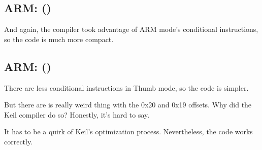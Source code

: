 ﻿\subsection{ARM: \OptimizingKeilVI (\ARMMode)}

And again, the compiler took advantage of ARM mode's conditional instructions, 
so the code is much more compact.



\subsection{ARM: \OptimizingKeilVI (\ThumbMode)}
\myindex{\CompilerAnomaly}
\label{Keil_anomaly}

There are less conditional instructions in Thumb mode, so the code is simpler.

But there are is really weird thing with the 0x20 and 0x19 offsets.
Why did the Keil compiler do so?
Honestly, it's hard to say.

It has to be a quirk of Keil's optimization process.
Nevertheless, the code works correctly.



